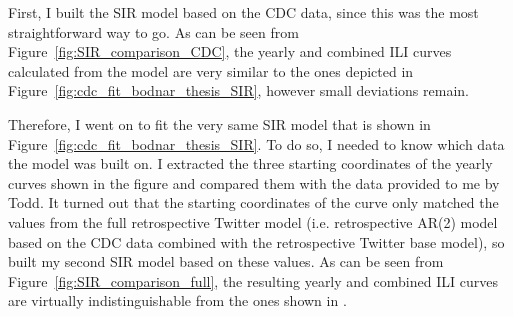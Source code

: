 \documentclass[11pt, a4paper,twoside]{report}\usepackage[]{graphicx}\usepackage[]{color}
\begin{document}
First, I built the SIR model based on the CDC data, since this was the most straightforward way to go. As can be seen from Figure~\ref{fig:SIR_comparison_CDC}, the yearly and combined ILI curves calculated from the model are very similar to the ones depicted in Figure~\ref{fig:cdc_fit_bodnar_thesis_SIR}, however small deviations remain.\newline

Therefore, I went on to fit the very same SIR model that is shown in Figure~\ref{fig:cdc_fit_bodnar_thesis_SIR}. To do so, I needed to know which data the model was built on. I extracted the three starting coordinates of the yearly curves shown in the figure and compared them with the data provided to me by Todd. It turned out that the starting coordinates of the curve only matched the values from the full retrospective Twitter model (i.e. retrospective AR(2) model based on the CDC data combined with the retrospective Twitter base model), so built my second SIR model based on these values. As can be seen from Figure~\ref{fig:SIR_comparison_full}, the resulting yearly and combined ILI curves are virtually indistinguishable from the ones shown in \citep{bodnar_data_2015}.\newline
\end{document}

